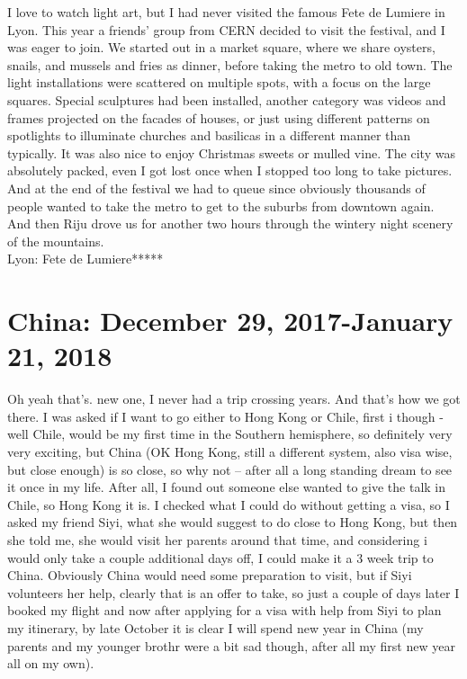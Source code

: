 I love to watch light art, but I had never visited the famous Fete de Lumiere in Lyon. This year a friends' group from CERN decided to visit the festival, and I was eager to join. We started out in a market square, where we share oysters, snails, and mussels and fries as dinner, before taking the metro to old town. The light installations were scattered on multiple spots, with a focus on the large squares. Special sculptures had been installed, another category was videos and frames projected on the facades of houses, or just using different patterns on spotlights to illuminate churches and basilicas in a different manner than typically. It was also nice to enjoy Christmas sweets or mulled vine. The city was absolutely packed, even I got lost once when I stopped too long to take pictures. And at the end of the festival we had to queue since obviously thousands of people wanted to take the metro to get to the suburbs from downtown again. And then Riju drove us for another two hours through the wintery night scenery of the mountains.\\

Lyon: Fete de Lumiere*****\\

\section{China: December 29, 2017-January 21, 2018}
\label{2018:China}

Oh yeah that's. new one, I never had a trip crossing years. And that's how we got there. I was asked if I want to go either to Hong Kong or Chile, first i though - well Chile, would be my first time in the Southern hemisphere, so definitely very very exciting, but China (OK Hong Kong, still a different system, also visa wise, but close enough) is so close, so why not -- after all a long standing dream to see it once in my life. After all, I found out someone else wanted to give the talk in Chile, so Hong Kong it is. I checked what I could do without getting a visa, so I asked my friend Siyi, what she would suggest to do close to Hong Kong, but then she told me, she would visit her parents around that time, and considering i would only take a couple additional days off, I could make it a 3 week trip to China. Obviously China would need some preparation to visit, but if Siyi volunteers her help, clearly that is an offer to take, so just a couple of days later I booked my flight and now after applying for a visa with help from Siyi to plan my itinerary, by late October it is clear I will spend new year in China (my parents and my younger brothr were a bit sad though, after all my first new year all on my own). \\

